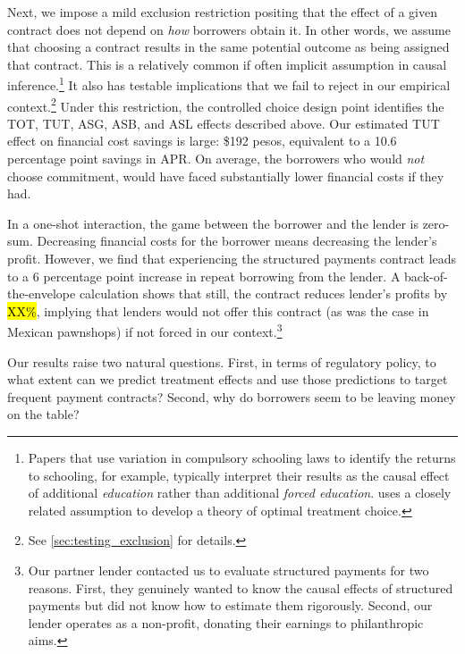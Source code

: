 \documentclass[12pt, a4paper]{article}
\begin{document}
Next, we impose a mild exclusion restriction positing that the effect of a given contract does not depend on \emph{how} borrowers obtain it. In other words, we assume that choosing a contract results in the same potential outcome as being assigned that contract. This is a relatively common if often implicit assumption in causal inference.\footnote{Papers that use variation in compulsory schooling laws to identify the returns to schooling, for example, typically interpret their results as the causal effect of additional \emph{education} rather than additional \emph{forced education}. \cite{chamberlain2011bayesian} uses a closely related assumption to develop a theory of optimal treatment choice.} 
It also has testable implications that we fail to reject in our empirical context.\footnote{See \autoref{sec:testing_exclusion} for details.}
Under this restriction, the controlled choice design point identifies the TOT, TUT, ASG, ASB, and ASL effects described above.  Our estimated TUT effect on financial cost savings is large: \$192 pesos, equivalent to a 10.6 percentage point savings in APR. On average, the borrowers who would \textit{not} choose commitment, would have faced substantially lower financial costs if they had. 

In a one-shot interaction, the game between the borrower and the lender is zero-sum. Decreasing financial costs for the borrower means decreasing the lender's profit. However, we find that experiencing the structured payments contract leads to a 6 percentage point increase in repeat borrowing from the lender. A back-of-the-envelope calculation shows that still, the contract reduces lender's profits by \hl{XX\%}, implying that lenders would not offer this contract (as was the case in Mexican pawnshops) if not forced in our context.\footnote{Our partner lender contacted us to evaluate structured payments for two reasons. First, they genuinely wanted to know the causal effects of structured payments but did not know how to estimate them rigorously. Second, our lender operates as a non-profit, donating their earnings to philanthropic aims.}

Our results raise two natural questions. First, in terms of regulatory policy, to what extent can we predict treatment effects and use those predictions to target frequent payment contracts? Second, why do borrowers seem to be leaving money on the table?
\end{document}
